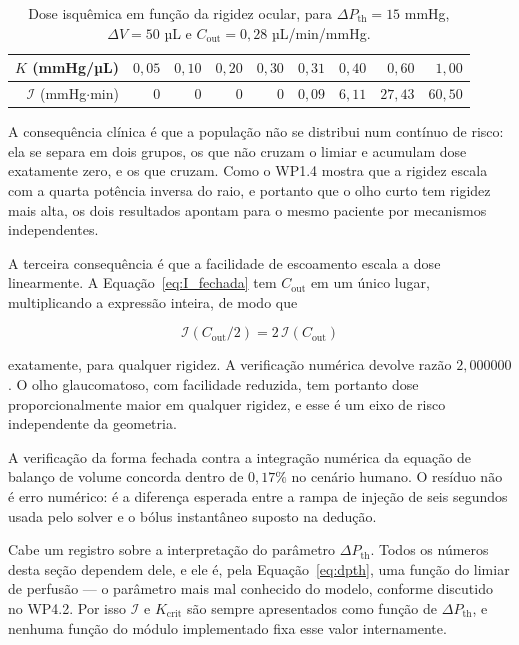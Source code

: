 \begin{table}[h]
\centering
\caption{Dose isquêmica em função da rigidez ocular, para $\Delta P_{\mathrm{th}}=15$ mmHg, $\Delta V=50$ µL e $C_{\mathrm{out}}=0{,}28$ µL/min/mmHg.}
\label{tab:wp43_IK}
\begin{tabular}{@{}rrrrrrrrr@{}}
\toprule
$K$ (mmHg/µL) & $0{,}05$ & $0{,}10$ & $0{,}20$ & $0{,}30$ & $0{,}31$ & $0{,}40$ & $0{,}60$ & $1{,}00$ \\
\midrule
$\mathcal{I}$ (mmHg$\cdot$min) & $0$ & $0$ & $0$ & $0$ & $0{,}09$ & $6{,}11$ & $27{,}43$ & $60{,}50$ \\
\bottomrule
\end{tabular}
\end{table}

A consequência clínica é que a população não se distribui num contínuo de risco: ela se separa em dois grupos, os que não cruzam o limiar e acumulam dose exatamente zero, e os que cruzam. Como o WP1.4 mostra que a rigidez escala com a quarta potência inversa do raio, e portanto que o olho curto tem rigidez mais alta, os dois resultados apontam para o mesmo paciente por mecanismos independentes.

A terceira consequência é que a facilidade de escoamento escala a dose linearmente. A Equação~\ref{eq:I_fechada} tem $C_{\mathrm{out}}$ em um único lugar, multiplicando a expressão inteira, de modo que

\begin{equation}
\mathcal{I}\!\left(C_{\mathrm{out}}/2\right)=2\,\mathcal{I}\!\left(C_{\mathrm{out}}\right)
\label{eq:escala_cout}
\end{equation}

exatamente, para qualquer rigidez. A verificação numérica devolve razão $2{,}000000$. O olho glaucomatoso, com facilidade reduzida, tem portanto dose proporcionalmente maior em qualquer rigidez, e esse é um eixo de risco independente da geometria.

A verificação da forma fechada contra a integração numérica da equação de balanço de volume concorda dentro de $0{,}17\%$ no cenário humano. O resíduo não é erro numérico: é a diferença esperada entre a rampa de injeção de seis segundos usada pelo solver e o bólus instantâneo suposto na dedução.

Cabe um registro sobre a interpretação do parâmetro $\Delta P_{\mathrm{th}}$. Todos os números desta seção dependem dele, e ele é, pela Equação~\ref{eq:dpth}, uma função do limiar de perfusão --- o parâmetro mais mal conhecido do modelo, conforme discutido no WP4.2. Por isso $\mathcal{I}$ e $K_{\mathrm{crit}}$ são sempre apresentados como função de $\Delta P_{\mathrm{th}}$, e nenhuma função do módulo implementado fixa esse valor internamente.

